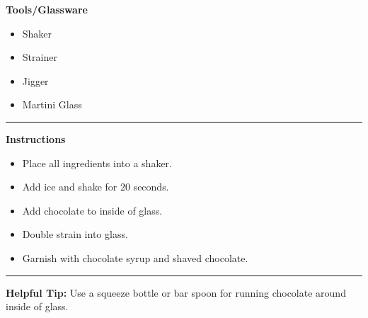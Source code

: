 \hspace{.01\textwidth}\vrule\hspace{.01\textwidth}
\begin{minipage}[t]{.49\textwidth}
    \noindent
    \textbf{\large Tools/Glassware}
    \begin{itemize}
        \item Shaker
        \item Strainer
        \item Jigger
        \item Martini Glass
    \end{itemize}
\end{minipage}
\vspace{.5em}\hrule\vspace{.5em}
\noindent
\begin{minipage}{\textwidth}
    \noindent
    \textbf{\large Instructions}
    \begin{itemize}
        \item Place all ingredients into a shaker.
        \item Add ice and shake for 20 seconds.
        \item Add chocolate to inside of glass.
        \item Double strain into glass.
        \item Garnish with chocolate syrup and shaved chocolate.
    \end{itemize}
\end{minipage}
\vspace{.5em}\hrule\vspace{.5em}
\noindent
\textbf{\large Helpful Tip:} Use a squeeze bottle or bar spoon for running chocolate around inside of glass.
\newpage
